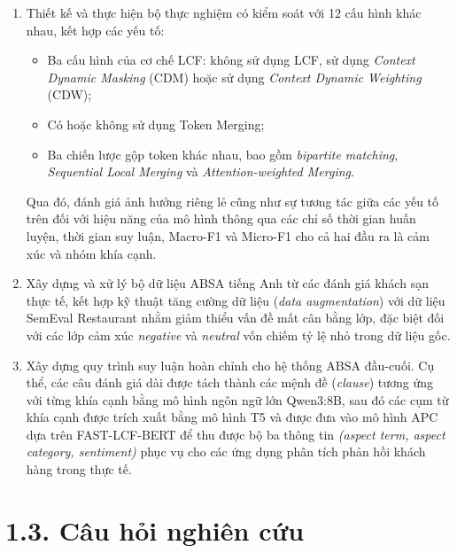 \begin{enumerate}
\begin{itemize}
        \item \textbf{Attention-weighted Merging}: ưu tiên gộp các token có trọng số chú ý thấp, đồng thời bảo vệ các token thuộc vị trí khía cạnh (được đánh dấu bởi LCF) cũng như các token có trọng số chú ý cao nhằm hạn chế mất mát thông tin ngữ nghĩa quan trọng.
    \end{itemize}

\item Thiết kế và thực hiện bộ thực nghiệm có kiểm soát với 12 cấu hình khác nhau, kết hợp các yếu tố:
\begin{itemize}
    \item Ba cấu hình của cơ chế LCF: không sử dụng LCF, sử dụng \textit{Context Dynamic Masking} (CDM) hoặc sử dụng \textit{Context Dynamic Weighting} (CDW);
    
    \item Có hoặc không sử dụng Token Merging;
    
    \item Ba chiến lược gộp token khác nhau, bao gồm \textit{bipartite matching}, \textit{Sequential Local Merging} và \textit{Attention-weighted Merging}.
\end{itemize}
Qua đó, đánh giá ảnh hưởng riêng lẻ cũng như sự tương tác giữa các yếu tố trên đối với hiệu năng của mô hình thông qua các chỉ số thời gian huấn luyện, thời gian suy luận, Macro-F1 và Micro-F1 cho cả hai đầu ra là cảm xúc và nhóm khía cạnh.

    \item Xây dựng và xử lý bộ dữ liệu ABSA tiếng Anh từ các đánh giá khách sạn thực tế, kết hợp kỹ thuật tăng cường dữ liệu (\textit{data augmentation}) với dữ liệu SemEval Restaurant nhằm giảm thiểu vấn đề mất cân bằng lớp, đặc biệt đối với các lớp cảm xúc \textit{negative} và \textit{neutral} vốn chiếm tỷ lệ nhỏ trong dữ liệu gốc.

    \item Xây dựng quy trình suy luận hoàn chỉnh cho hệ thống ABSA đầu-cuối. Cụ thể, các câu đánh giá dài được tách thành các mệnh đề (\textit{clause}) tương ứng với từng khía cạnh bằng mô hình ngôn ngữ lớn Qwen3:8B, sau đó các cụm từ khía cạnh được trích xuất bằng mô hình T5 và được đưa vào mô hình APC dựa trên FAST-LCF-BERT để thu được bộ ba thông tin \textit{(aspect term, aspect category, sentiment)} phục vụ cho các ứng dụng phân tích phản hồi khách hàng trong thực tế.

\end{enumerate}

\section{1.3. Câu hỏi nghiên cứu}

